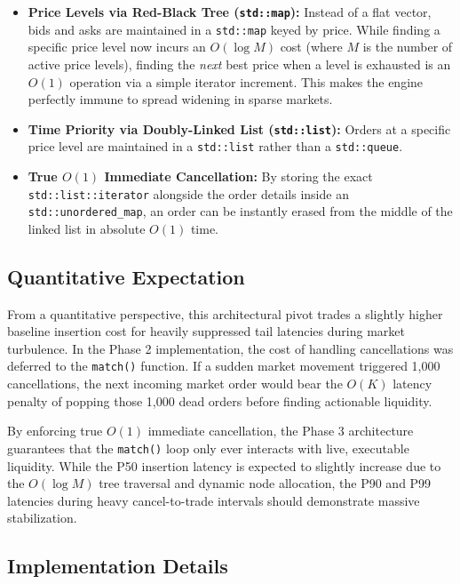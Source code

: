 \documentclass{article}
\begin{document}
\begin{itemize}
    \item \textbf{Price Levels via Red-Black Tree (\texttt{std::map}):} Instead of a flat vector, bids and asks are maintained in a \texttt{std::map} keyed by price. While finding a specific price level now incurs an $O(\log M)$ cost (where $M$ is the number of active price levels), finding the \textit{next} best price when a level is exhausted is an $O(1)$ operation via a simple iterator increment. This makes the engine perfectly immune to spread widening in sparse markets.
    \item \textbf{Time Priority via Doubly-Linked List (\texttt{std::list}):} Orders at a specific price level are maintained in a \texttt{std::list} rather than a \texttt{std::queue}.
    \item \textbf{True $O(1)$ Immediate Cancellation:} By storing the exact \texttt{std::list::iterator} alongside the order details inside an \texttt{std::unordered\_map}, an order can be instantly erased from the middle of the linked list in absolute $O(1)$ time.
\end{itemize}

\subsection{Quantitative Expectation}
From a quantitative perspective, this architectural pivot trades a slightly higher baseline insertion cost for heavily suppressed tail latencies during market turbulence. In the Phase 2 implementation, the cost of handling cancellations was deferred to the \texttt{match()} function. If a sudden market movement triggered 1,000 cancellations, the next incoming market order would bear the $O(K)$ latency penalty of popping those 1,000 dead orders before finding actionable liquidity.

By enforcing true $O(1)$ immediate cancellation, the Phase 3 architecture guarantees that the \texttt{match()} loop only ever interacts with live, executable liquidity. While the P50 insertion latency is expected to slightly increase due to the $O(\log M)$ tree traversal and dynamic node allocation, the P90 and P99 latencies during heavy cancel-to-trade intervals should demonstrate massive stabilization.

\subsection{Implementation Details}
\end{document}
